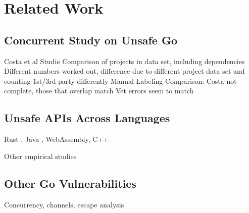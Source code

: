 
\chapter{Related Work}\label{ch:related-work}



\section{Concurrent Study on Unsafe Go}\label{sec:related-work:concurrent-study}

Costa et al Studie \cite{costa2020}
Comparison of projects in data set, including dependencies
Different numbers worked out, difference due to different project data set and counting 1st/3rd party differently
Manual Labeling Comparison: Costa not complete, those that overlap match
Vet errors seem to match



\section{Unsafe APIs Across Languages}\label{sec:related-work:unsafe-across-languages}

Rust \cite{evans2020, qin2020}, Java \cite{huang2019, mastrangelo2015, wickert2019}, WebAssembly, C++ \cite{alnaeli2017, larochelle2001}

Other empirical studies \cite{difranco2017, lu2013, chou2001, leesatapornwongsa2016, lauinger2017, jin2012, gunawi2014, gu2015}



\section{Other Go Vulnerabilities}\label{sec:related-work:other-go-vulnerabilities}

Concurrency, channels, escape analysis \cite{wang2020, sibiryov2017, tu2019, giunti2020, lange2017, zhou2017, dilley2019, hill2002, hannan1998, choi1999}



